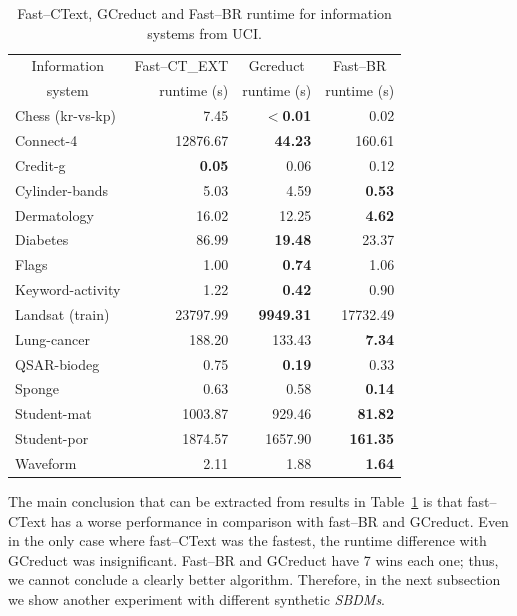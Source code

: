 \documentclass[number,preprint,review,12pt]{elsarticle}
\begin{document}
	\begin{table}[htb]
		\centering 
		\caption{Fast--CText, GCreduct and Fast--BR runtime for information systems from UCI.}
		\label{tab:java}
		\begin{tabular}{|l|r|r|r|}
			\hline
			\multicolumn{1}{|c|}{Information}  &\multicolumn{1}{c|}{Fast--CT\_EXT} & \multicolumn{1}{c|}{Gcreduct} & \multicolumn{1}{c|}{Fast--BR}  \\
			\multicolumn{1}{|c|}{system} & runtime (s) & runtime (s)  & runtime (s) \\
			\hline
			Chess (kr-vs-kp) & 7.45          & \textbf{$<$0.01} & 0.02            \\
			Connect-4        & 12876.67      & \textbf{44.23}   & 160.61          \\
			Credit-g         & \textbf{0.05} & 0.06             & 0.12            \\
			Cylinder-bands   & 5.03          & 4.59             & \textbf{0.53}   \\
			Dermatology      & 16.02         & 12.25            & \textbf{4.62}   \\
			Diabetes         & 86.99         & \textbf{19.48}   & 23.37           \\
			Flags            & 1.00          & \textbf{0.74}    & 1.06            \\
			Keyword-activity & 1.22          & \textbf{0.42}    & 0.90            \\
			Landsat (train)  & 23797.99      & \textbf{9949.31} & 17732.49        \\
			Lung-cancer      & 188.20        & 133.43           & \textbf{7.34}   \\
			QSAR-biodeg      & 0.75          & \textbf{0.19}    & 0.33            \\
			Sponge           & 0.63          & 0.58             & \textbf{0.14}   \\
 			Student-mat      & 1003.87       & 929.46           & \textbf{81.82}  \\
			Student-por      & 1874.57       & 1657.90          & \textbf{161.35} \\
			Waveform         & 2.11          & 1.88             & \textbf{1.64}   \\
			\hline
		\end{tabular}
	\end{table}

    The main conclusion that can be extracted from results in Table~\ref{tab:java} is that fast--CText has a worse performance in comparison with fast--BR and GCreduct. Even in the only case where fast--CText was the fastest, the runtime difference with GCreduct was insignificant. Fast--BR and GCreduct have 7 wins each one; thus, we cannot conclude a clearly better algorithm. Therefore, in the next subsection we show another experiment with different synthetic \textit{SBDMs}.
    
\end{document}
